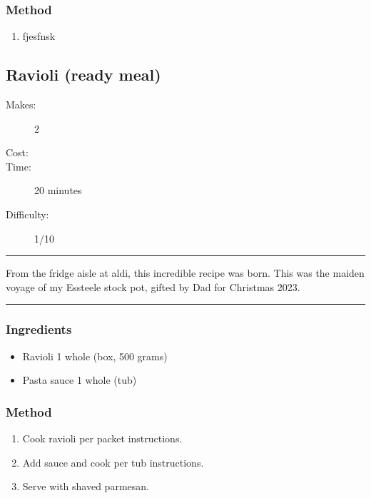 \documentclass[]{article}
\begin{document}
\subsubsection*{\Large Method}
\begin{enumerate}[font=\huge\color{accent}]
	\item fjesfnsk
\end{enumerate}
\newpage
{}\label{rec:Ravioli (ready meal)}
\subsection*{\center\huge Ravioli (ready meal)}
\begin{description}
\item[Makes:] 2 
\item[Cost:] \textdollar
\item[Time:] 20 minutes
\item[Difficulty:] 1/10
\end{description}
\vspace{0.2cm}\hrule\vspace{0.5cm}
\begin{adjustwidth}{0.5 cm}{0.5 cm}

From the fridge aisle at aldi, this incredible recipe was born. This was the maiden voyage of my Essteele stock pot, gifted by Dad for Christmas 2023. \hfill{}\color{black}

\end{adjustwidth}
\vspace{0.5cm}\hrule
\subsubsection*{\Large Ingredients}
\begin{multicols}{2}
\begin{itemize}
 \item Ravioli \hfill 1 whole (box, 500 grams)
 \item Pasta sauce \hfill 1 whole (tub)
\end{itemize}
\end{multicols}
\subsubsection*{\Large Method}
\begin{enumerate}[font=\huge\color{accent}]
	\item Cook ravioli per packet instructions.
	\item Add sauce and cook per tub instructions.
	\item Serve with shaved parmesan.
\end{enumerate}
\newpage
{}\label{rec:Red Sauce Rigatoni}
\end{document}
